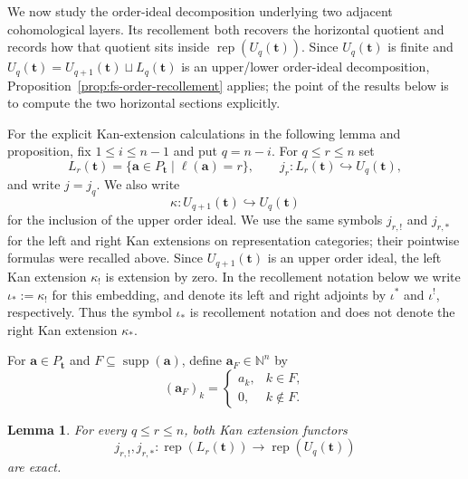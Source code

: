 \documentclass[10pt,a4paper]{amsart}
\newtheorem{lemma}[theorem]{Lemma}
\newcommand{\Rep}{\operatorname{rep}}
\begin{document}
We now study the order-ideal decomposition underlying two adjacent
cohomological layers.  Its recollement both recovers the horizontal quotient
and records how that quotient sits inside $\Rep(U_q(\mathbf t))$.  Since
$U_q(\mathbf t)$ is finite and
$U_q(\mathbf t)=U_{q+1}(\mathbf t)\sqcup L_q(\mathbf t)$ is an upper/lower
order-ideal decomposition, Proposition~\ref{prop:fs-order-recollement}
applies; the point of the results below is to compute the two horizontal
sections explicitly.

For the explicit Kan-extension calculations in the following lemma and
proposition, fix $1\le i\le n-1$ and put $q=n-i$.  For $q\le r\le n$ set
\[
L_r(\mathbf t)=\{\mathbf a\in P_{\mathbf t}\mid\ell(\mathbf a)=r\},
\qquad
j_r:L_r(\mathbf t)\hookrightarrow U_q(\mathbf t),
\]
and write $j=j_q$.  We also write
\[
\kappa:U_{q+1}(\mathbf t)\hookrightarrow U_q(\mathbf t)
\]
for the inclusion of the upper order ideal.  We use the same symbols
$j_{r,!}$ and $j_{r,*}$ for the left and right Kan extensions on
representation categories; their pointwise formulas were recalled above.
Since $U_{q+1}(\mathbf t)$ is an upper order ideal, the left Kan extension
$\kappa_!$ is extension by zero.  In the recollement notation below we write
$\iota_*:=\kappa_!$ for this embedding, and denote its left and right
adjoints by $\iota^*$ and $\iota^!$, respectively.  Thus the symbol
$\iota_*$ is recollement notation and does not denote the right Kan
extension $\kappa_*$.

For $\mathbf a\in P_{\mathbf t}$ and $F\subseteq\operatorname{supp}(\mathbf a)$, define $\mathbf a_F\in \mathbb N^n$ by
\[
(\mathbf a_F)_k=
\begin{cases}
a_k,&k\in F,\\
0,&k\notin F.
\end{cases}
\]

\begin{lemma}\label{lem:stratum-kan-exact}
For every $q\le r\le n$, both Kan extension functors
\[
j_{r,!},j_{r,*}:\Rep(L_r(\mathbf t))\longrightarrow\Rep(U_q(\mathbf t))
\]
are exact.
\end{lemma}
\end{document}

